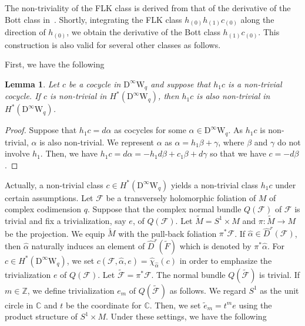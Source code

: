 \documentclass[12pt]{amsart}
\newcommand{\CF}{{\mathcal F}}
\newcommand{\C}{{\mathbb C}}
\newcommand{\Z}{{\mathbb Z}}
\newcommand{\W}{\mathrm{W}}
\newcommand{\D}{\mathrm{D}}
\newcommand{\Wedge}{{\textstyle\bigwedge}}
\newtheorem{lemma}[theorem]{Lemma}
\theoremstyle{definition}
\theoremstyle{remark}
\begin{document}
The non-triviality of the FLK class is derived from that of the derivative of the Bott class in~\cite{asuke:FLK}.
Shortly, integrating the FLK class $h_{(0)}h_{(1)}c_{(0)}$ along the direction of $h_{(0)}$, we obtain the derivative of the Bott class $h_{(1)}c_{(0)}$.
This construction is also valid for several other classes as follows.

First, we have the following

\begin{lemma}
Let $c$ be a cocycle in $\D^\infty\W_q$ and suppose that $h_1c$ is a non-trivial cocycle.
If $c$ is non-trivial in $H^*(\D^\infty\W_q)$, then $h_1c$ is also non-trivial in $H^*(\D^\infty\W_q)$.
\end{lemma}
\begin{proof}
Suppose that $h_1c=d\alpha$ as cocycles for some $\alpha\in\D^\infty\W_q$.
As $h_1c$ is non-trivial, $\alpha$ is also non-trivial.
We represent $\alpha$ as $\alpha=h_1\beta+\gamma$, where $\beta$ and $\gamma$ do not involve $h_1$.
Then, we have $h_1c=d\alpha=-h_1d\beta+c_1\beta+d\gamma$ so that we have $c=-d\beta$.
\end{proof}

Actually, a non-trivial class $c\in H^*(\D^\infty\W_q)$ yields a non-trivial class $h_1c$ under certain assumptions.
Let $\CF$ be a transversely holomorphic foliation of $M$ of complex codimension $q$.
Suppose that the complex normal bundle $Q(\CF)$ of $\CF$ is trivial and fix a trivialization, say $e$, of $Q(\CF)$.
Let $\widetilde{M}=S^1\times M$ and $\pi\colon\widetilde{M}\to M$ be the projection.
We equip $\widetilde{M}$ with the pull-back foliation $\pi^*\CF$.
If $\widehat\alpha\in\widehat{D}^r(\CF)$, then $\widehat\alpha$ naturally induces an element of $\widehat{D}^r(\widetilde{F})$ which is denoted by $\pi^*\widehat\alpha$.
For $c\in H^*(\D^\infty\W_q)$, we set $c(\CF,\widehat\alpha,e)=\widehat\chi_{\widehat\alpha}(c)$ in order to emphasize the trivialization $e$ of $Q(\CF)$.
Let $\widetilde\CF=\pi^*\CF$.
The normal bundle $Q(\widetilde\CF)$ is trivial.
If $m\in\Z$, we define trivialization $e_m$ of $Q(\widetilde\CF)$ as follows.
We regard $S^1$ as the unit circle in $\C$ and $t$ be the coordinate for $\C$.
Then, we set $\widetilde{e}_m=t^me$ using the product structure of $S^1\times M$.
Under these settings, we have the following
\end{document}

